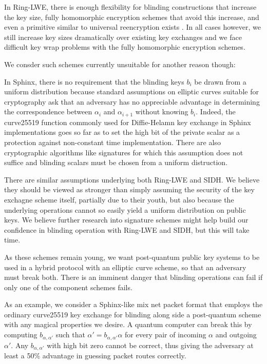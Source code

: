 \documentclass[twoside,letterpaper]{llncs}
\begin{document}
In Ring-LWE, there is enough flexibility for blinding constructions
that increase the key size, fully homomorphic encryption schemes that
avoid this increase, and even a primitive similar to universal
reencryption exists \cite{963628}.  In all cases however, we still
increase key sizes dramatically over existing key exchanges and we face
difficult key wrap problems with the fully homomorphic encryption
schemes.

\smallskip

We consder such schemes currently unsuitable for another reason though: 

In Sphinx, there is no requirement that the blinding keys $b_i$ be
drawn from a uniform distribution because standard assumptions on
elliptic curves suitable for cryptography ask that an adversary has
no appreciable advantage in determining the correspondence between
$\alpha_i$ and $\alpha_{i+1}$ without knowing $b_i$.  
Indeed, the curve25519 function commonly used for Diffie-Helamn key
exchange in Sphinx implementations goes so far as to set the high bit
of the private scalar as a protection against non-constant time
implementation.
There are also cryptographic algorithms like signatures for which
this assumption does not suffice and blinding scalars must be chosen
from a uniform distruction.

There are similar assumptions underlying both Ring-LWE and SIDH.
We believe they should be viewed as stronger than simply assuming the
security of the key exchagne scheme itself, partially due to their
youth, but also because the underlying operations cannot so easily
yield a uniform distribution on public keys.  We believe further
research into signature schemes might help build our confidence in
blinding operation with Ring-LWE and SIDH, but this will take time.

As these schemes remain young, we want post-quantum public key
systems to be used in a hybrid protocol with an elliptic curve scheme,
so that an adversary must break both.  There is an imminent danger
that blinding operations can fail if only one of the component schemes
fails.

As an example, we consider a Sphinx-like mix net packet format that
employs the ordinary curve25519 key exchange for blinding along side
a post-quantum scheme with any magical properties we desire.  
A quantum computer can break this by computing $b_{\alpha,\alpha'}$
such that $\alpha' = b_{\alpha,\alpha'} \alpha$ for every pair of
incoming $\alpha$ and outgoing $\alpha'$.  Any $b_{\alpha,\alpha'}$
with high bit zero cannot be correct, thus giving the adversary at
least a 50\% advantage in guessing packet routes correctly.
\end{document}
